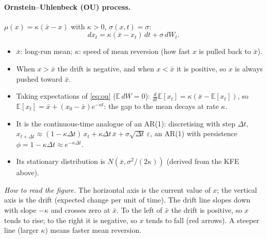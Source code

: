 \paragraph{Ornstein--Uhlenbeck (OU) process.} $\mu(x)=\kappa(\bar x-x)$ with $\kappa>0$, $\sigma(x,t)=\sigma$:
\begin{equation}\label{eq:ou}
dx_t=\kappa(\bar x-x_t)\,dt+\sigma\,dW_t.
\end{equation}
\begin{itemize}
\item $\bar x$: long-run mean; $\kappa$: speed of mean reversion (how fast $x$ is pulled back to $\bar x$).
\item When $x>\bar x$ the drift is negative, and when $x<\bar x$ it is positive, so $x$ is always pushed toward $\bar x$.
\item Taking expectations of \eqref{eq:ou} ($\mathbb{E}\,dW=0$): $\frac{d}{dt}\mathbb{E}[x_t]=\kappa(\bar x-\mathbb{E}[x_t])$, so $\mathbb{E}[x_t]=\bar x+(x_0-\bar x)e^{-\kappa t}$: the gap to the mean decays at rate $\kappa$.
\item It is the continuous-time analogue of an AR(1): discretising with step $\Delta t$, $x_{t+\Delta t}\approx(1-\kappa\Delta t)\,x_t+\kappa\Delta t\,\bar x+\sigma\sqrt{\Delta t}\,\varepsilon$, an AR(1) with persistence $\phi=1-\kappa\Delta t\approx e^{-\kappa\Delta t}$.
\item Its stationary distribution is $N(\bar x,\sigma^2/(2\kappa))$ (derived from the KFE above).
\end{itemize}

\begin{center}
\end{center}
\textit{How to read the figure.} The horizontal axis is the current value of $x$; the vertical axis is the drift (expected change per unit of time). The drift line slopes down with slope $-\kappa$ and crosses zero at $\bar x$. To the left of $\bar x$ the drift is positive, so $x$ tends to rise; to the right it is negative, so $x$ tends to fall (red arrows). A steeper line (larger $\kappa$) means faster mean reversion.

